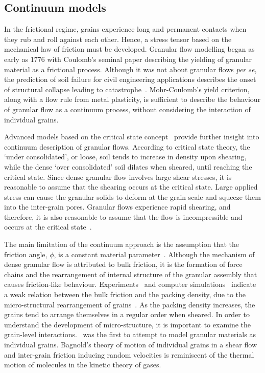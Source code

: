 \subsection{Continuum models}

In the frictional regime, grains experience long and permanent contacts when 
they rub and roll against each other. Hence, a stress tensor based on the 
mechanical law of friction must be developed. Granular flow modelling began as 
early as 1776 with Coulomb's seminal paper describing the yielding of granular 
material as a frictional process. Although it was not about granular flows 
\textit{per se}, the prediction of 
soil failure for civil engineering applications describes the onset of 
structural collapse leading to catastrophe~\citep{Campbell2006}. Mohr-Coulomb's 
yield criterion, along with a flow rule from metal plasticity, is sufficient to 
describe the behaviour of granular flow as a continuum process, without 
considering the interaction of individual grains.

Advanced models based on the critical state concept~\citep{Schofield1968} 
provide further insight into 
continuum description of granular flows. According to critical state 
theory, the `under consolidated', or loose, soil tends to increase in density 
upon shearing, while the dense `over consolidated' soil dilates when sheared, 
until reaching the critical state. Since dense granular flow involves large 
shear stresses, it is reasonable to assume that the shearing occurs at the 
critical state. Large applied stress can cause the granular solids to deform 
at the grain scale and squeeze them into the inter-grain pores. Granular flows 
experience rapid shearing, and therefore, it is also reasonable to assume that 
the flow is incompressible and occurs at the critical 
state~\citep{Campbell2006}. 


The main limitation of the continuum approach is the assumption that the 
friction angle, $\phi$, is a constant material parameter~\citep{Potapov1996}. 
Although the mechanism of dense granular flow is 
attributed to bulk friction, it is the formation of force chains and the 
rearrangement of internal structure of the granular assembly that causes 
friction-like behaviour. Experiments~\citep{Savage1984,Savage1984a} and 
computer simulations~\citep{Campbell1985} indicate a weak relation between the 
bulk friction and the packing density, due to the micro-structural 
rearrangement of grains~\citep{Campbell1986}. As the packing density 
increases, the grains tend to arrange themselves in a regular order when 
sheared. In order to understand the development of micro-structure, it is 
important to examine the grain-level interactions.~\citet{Bagnold1954} was 
the first to attempt to model granular materials as individual grains. 
Bagnold's theory of motion of individual grains in a shear flow and 
inter-grain friction inducing random velocities is reminiscent of the 
thermal motion of molecules in the kinetic theory of gases. 

